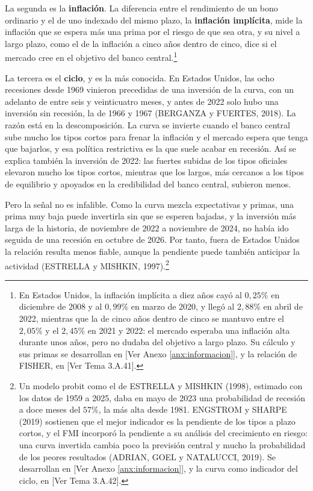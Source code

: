 \documentclass[10pt,a4paper]{article}
\newcommand{\authorfont}[1]{{\fontfamily{EBGaramond-TLF}\selectfont #1}}
\begin{document}
La segunda es la \textbf{inflación}. La diferencia entre el rendimiento de un bono ordinario y el de uno indexado del mismo plazo, la \textbf{inflación implícita}, mide la inflación que se espera más una prima por el riesgo de que sea otra, y su nivel a largo plazo, como el de la inflación a cinco años dentro de cinco, dice si el mercado cree en el objetivo del banco central.\footnote{%
    En Estados Unidos, la inflación implícita a diez años cayó al $0{,}25\%$ en diciembre de 2008 y al $0{,}99\%$ en marzo de 2020, y llegó al $2{,}88\%$ en abril de 2022, mientras que la de cinco años dentro de cinco se mantuvo entre el $2{,}05\%$ y el $2{,}45\%$ en 2021 y 2022: el mercado esperaba una inflación alta durante unos años, pero no dudaba del objetivo a largo plazo. Su cálculo y sus primas se desarrollan en [\authorfont{Ver Anexo \ref{anx:informacion}}], y la relación de FISHER, en [\authorfont{Ver Tema 3.A.41}].
}

La tercera es el \textbf{ciclo}, y es la más conocida. En Estados Unidos, las ocho recesiones desde 1969 vinieron precedidas de una inversión de la curva, con un adelanto de entre seis y veinticuatro meses, y antes de 2022 solo hubo una inversión sin recesión, la de 1966 y 1967 (BERGANZA y FUERTES, 2018). La razón está en la descomposición. La curva se invierte cuando el banco central sube mucho los tipos cortos para frenar la inflación y el mercado espera que tenga que bajarlos, y esa política restrictiva es la que suele acabar en recesión. Así se explica también la inversión de 2022: las fuertes subidas de los tipos oficiales elevaron mucho los tipos cortos, mientras que los largos, más cercanos a los tipos de equilibrio y apoyados en la credibilidad del banco central, subieron menos.

Pero la señal no es infalible. Como la curva mezcla expectativas y primas, una prima muy baja puede invertirla sin que se esperen bajadas, y la inversión más larga de la historia, de noviembre de 2022 a noviembre de 2024, no había ido seguida de una recesión en octubre de 2026. Por tanto, fuera de Estados Unidos la relación resulta menos fiable, aunque la pendiente puede también anticipar la actividad (ESTRELLA y MISHKIN, 1997).\footnote{%
    Un modelo probit como el de ESTRELLA y MISHKIN (1998), estimado con los datos de 1959 a 2025, daba en mayo de 2023 una probabilidad de recesión a doce meses del $57\%$, la más alta desde 1981. ENGSTROM y SHARPE (2019) sostienen que el mejor indicador es la pendiente de los tipos a plazo cortos, y el FMI incorporó la pendiente a su análisis del crecimiento en riesgo: una curva invertida cambia poco la previsión central y mucho la probabilidad de los peores resultados (ADRIAN, GOEL y NATALUCCI, 2019). Se desarrollan en [\authorfont{Ver Anexo \ref{anx:informacion}}], y la curva como indicador del ciclo, en [\authorfont{Ver Tema 3.A.42}].
}
\end{document}
